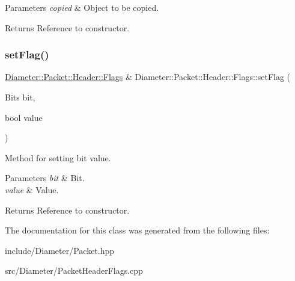 \begin{DoxyParams}{Parameters}
{\em copied} & Object to be copied. \\
\hline
\end{DoxyParams}
\begin{DoxyReturn}{Returns}
Reference to constructor. 
\end{DoxyReturn}
\mbox{\label{classDiameter_1_1Packet_1_1Header_1_1Flags_af50380856a40d98f7c82bc55fa4b61a6}} 
\subsubsection{\texorpdfstring{set\+Flag()}{setFlag()}}
{\footnotesize\ttfamily \hyperlink{classDiameter_1_1Packet_1_1Header_1_1Flags}{Diameter\+::\+Packet\+::\+Header\+::\+Flags} \& Diameter\+::\+Packet\+::\+Header\+::\+Flags\+::set\+Flag (\begin{DoxyParamCaption}\item[{Bits}]{bit,  }\item[{bool}]{value }\end{DoxyParamCaption})}



Method for setting bit value. 


\begin{DoxyParams}{Parameters}
{\em bit} & Bit. \\
\hline
{\em value} & Value. \\
\hline
\end{DoxyParams}
\begin{DoxyReturn}{Returns}
Reference to constructor. 
\end{DoxyReturn}


The documentation for this class was generated from the following files\+:\begin{DoxyCompactItemize}
\item 
include/\+Diameter/Packet.\+hpp\item 
src/\+Diameter/Packet\+Header\+Flags.\+cpp\end{DoxyCompactItemize}
